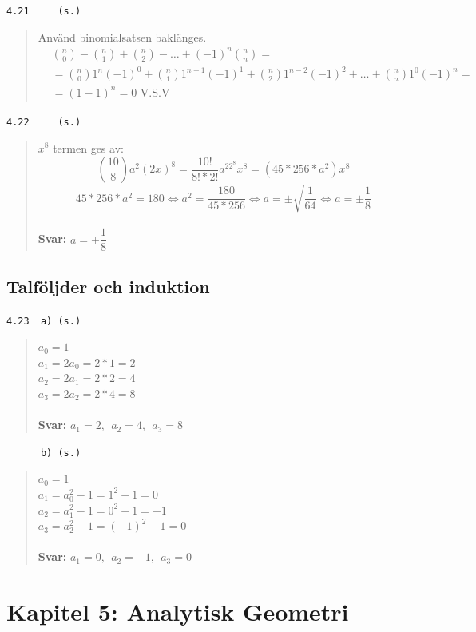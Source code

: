 \documentclass[a4paper]{article}
\newcommand{\tskcol}[1]{\textcolor{tskcol}{#1}}
\begin{document}
	\texttt{\tskcol{4.21~~~~ (s.)}}
	\begin{quotation}
		\noindent
		Använd binomialsatsen baklänges.
		\begin{align*}
		&{n \choose 0}-{n \choose 1}+{n \choose 2}-\ldots+(-1)^n{n \choose n}= \\
		&={n \choose 0}1^n(-1)^0+{n \choose 1}1^{n-1}(-1)^1+{n \choose 2}1^{n-2}(-1)^2+\ldots+{n \choose n}1^{0}(-1)^n=\\
		&=(1-1)^n=
		0 \text{ V.S.V}
		\end{align*}
	\end{quotation}
	
	\texttt{\tskcol{4.22~~~~ (s.)}}
	\begin{quotation}
		\noindent
		$x^8$ termen ges av:
		\[{10 \choose 8}a^2(2x)^8=
		\frac{10!}{8!*2!}a^22^8x^8=
		(45*256*a^2)x^8\]
		\[45*256*a^2=180 \Leftrightarrow
		a^2=\frac{180}{45*256} \Leftrightarrow
		a=\pm\sqrt{\frac{1}{64}}\Leftrightarrow
		a=\pm\frac{1}{8}\]
		\\
		\textbf{Svar:} $a=\pm\dfrac{1}{8}$
	\end{quotation}
	
	\subsection*{Talföljder och induktion}
	
	\texttt{\tskcol{4.23~~a) (s.)}}
	\begin{quotation}
		\noindent
		$a_0=1$ \\
		$a_1=2a_0=2*1=2$ \\
		$a_2=2a_1=2*2=4$ \\
		$a_3=2a_2=2*4=8$
		\\ \\
		\textbf{Svar:} $a_1=2,~~a_2=4,~~a_3=8$
	\end{quotation}
	
	\texttt{\tskcol{~~~~~~b) (s.)}}
	\begin{quotation}
		\noindent
		$a_0=1$ \\
		$a_1=a_0^2-1=1^2-1=0$ \\
		$a_2=a_1^2-1=0^2-1=-1$ \\
		$a_3=a_2^2-1=(-1)^2-1=0$
		\\ \\
		\textbf{Svar:} $a_1=0,~~a_2=-1,~~a_3=0$
	\end{quotation}
	
	\pagebreak
	\section*{Kapitel 5: Analytisk Geometri}
\end{document}

